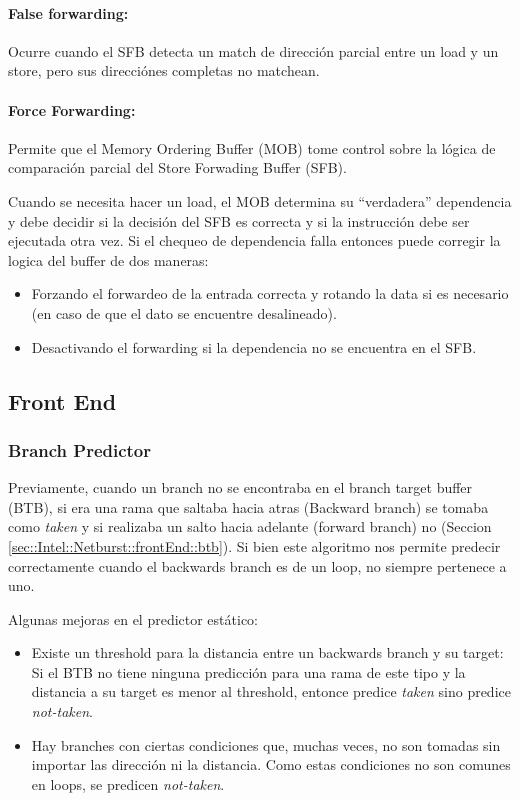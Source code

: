 \paragraph{False forwarding:} Ocurre cuando el SFB detecta un match de dirección parcial entre un load y un store, pero sus direcciónes completas no matchean.

\paragraph{Force Forwarding:} Permite que el Memory Ordering Buffer (MOB) tome control sobre la lógica de comparación parcial del Store Forwading Buffer (SFB).
	
Cuando se necesita hacer un load, el MOB determina su ``verdadera'' dependencia y debe decidir si la decisión del SFB es correcta y si la instrucción debe ser ejecutada otra vez. Si el chequeo de dependencia falla entonces puede corregir la logica del buffer de dos maneras:
	\begin{itemize}
		\item Forzando el forwardeo de la entrada correcta y rotando la data si es necesario (en caso de que el dato se encuentre desalineado).
		\item Desactivando el forwarding si la dependencia no se encuentra en el SFB.
	\end{itemize}
\subsection{Front End}
\subsubsection{Branch Predictor}
Previamente, cuando un branch no se encontraba en el branch target buffer (BTB), si era una rama que saltaba hacia atras (Backward branch) se tomaba como \textit{taken} y si realizaba un salto hacia adelante (forward branch) no
 (Seccion \ref{sec::Intel::Netburst::frontEnd::btb}). Si bien este algoritmo nos permite predecir correctamente cuando el backwards branch es de un loop, no siempre pertenece a uno.

Algunas mejoras en el predictor estático:
\begin{itemize}
	\item Existe un threshold para la distancia entre un backwards branch y su target: Si el BTB no tiene ninguna predicción para una rama de este tipo y la distancia a su target es menor al threshold, entonce predice \textit{taken} sino predice \textit{not-taken}.
	\item Hay branches con ciertas condiciones que, muchas veces, no son tomadas sin importar las dirección ni la distancia. Como estas condiciones no son comunes en loops, se predicen \textit{not-taken}.
\end{itemize}

